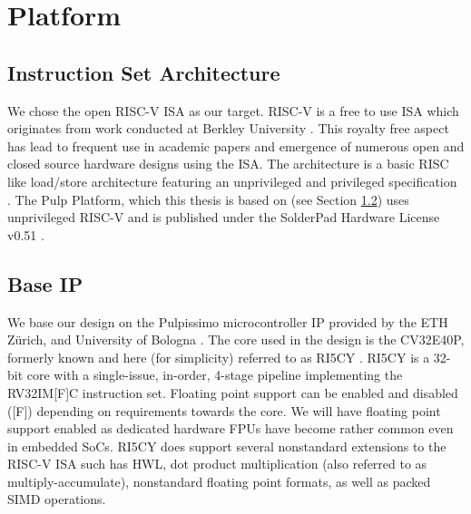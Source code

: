 \documentclass[../bachelor_paper.tex]{subfiles}
\begin{document}
\chapter{Platform}
    \label{ch:plat}

\section{Instruction Set Architecture}
We chose the open RISC-V \ac{ISA} as our target. RISC-V is a free to use \acf{ISA} which originates from work conducted at Berkley University \cite{HistoryRISCV2022}. This royalty free aspect has lead to frequent use in academic papers and emergence of numerous open and closed source hardware designs using the \ac{ISA}. The architecture is a basic RISC like load/store architecture featuring an unprivileged and privileged specification \cite{RISCVInstructionSet2022}. The Pulp Platform, which this thesis is based on (see Section \ref{sec:plat:base}) uses unprivileged RISC-V and is published under the SolderPad Hardware License v0.51 \cite{GitHubPulpplatformPulpissimo2021}.

\section{Base IP}
    \label{sec:plat:base}
We base our design on the Pulpissimo microcontroller IP provided by the ETH Z\"urich, and University of Bologna \cite{schiavoneQuentinUltraLowPowerPULPissimo2018}. The core used in the design is the CV32E40P, formerly known and here (for simplicity) referred to as RI5CY \cite{gautschiNearThresholdRISCVCore2017}. RI5CY is a 32-bit core with a single-issue, in-order, 4-stage pipeline implementing the RV32IM[F]C instruction set. Floating point support can be enabled and disabled ([F]) depending on requirements towards the core. We will have floating point support enabled as dedicated hardware \acp{FPU} have become rather common even in embedded \acp{SoC}. RI5CY does support several nonstandard extensions to the RISC-V \ac{ISA} such has \acl{HWL}, dot product multiplication (also referred to as multiply-accumulate), nonstandard floating point formats, as well as packed SIMD operations.
\end{document}
